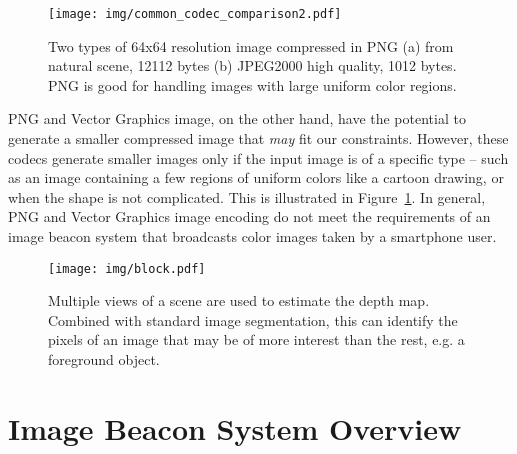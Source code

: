 \begin{figure}[!htb]
    \begin{center}
    	\vspace{-1em}
	    \texttt{[image: img/common\_codec\_comparison2.pdf]}
	    \vspace{-1em}
	    \caption{\footnotesize Two types of 64x64 resolution image compressed in PNG (a) from natural scene, 12112 bytes (b) JPEG2000 high quality, 1012 bytes. PNG is good for handling images with large uniform color regions. }
	    \label{fig:png_block}
	    \vspace{-1em}
    \end{center}
\end{figure}

PNG and Vector Graphics image, on the other hand, have the potential to generate a smaller compressed image that \textit{may} fit our constraints. However, these codecs generate smaller images only if the input image is of a specific type -- such as an image containing a few regions of uniform colors like a cartoon drawing, or when the shape is not complicated. This is illustrated in Figure~\ref{fig:png_block}. In general, PNG and Vector Graphics image encoding do not meet the requirements of an image beacon system that broadcasts color images taken by a smartphone user.






\begin{figure*}[!thb]
 \texttt{[image: img/block.pdf]}
 \caption{\footnotesize Multiple views of a scene are used to estimate the depth map. Combined with standard image segmentation, this can identify the pixels of an image that may be of more interest than the rest, e.g. a foreground object.}
 \label{fig:blocks3}
 \vspace{-1em}
\end{figure*}


\section{Image Beacon System Overview}
\label{sec:system}

